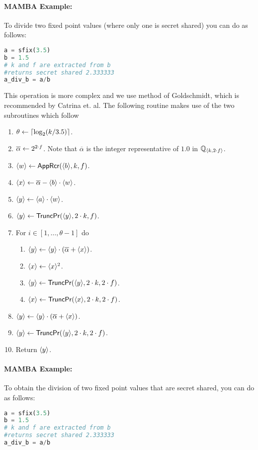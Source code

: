 \paragraph{MAMBA Example:} To divide two fixed point values (where only one is secret shared) you can do as follows:
\begin{lstlisting}[language={python}]
a = sfix(3.5)
b = 1.5
# k and f are extracted from b
#returns secret shared 2.333333
a_div_b = a/b
\end{lstlisting}
This operation is more complex and we use method of Goldschmidt, which
is recommended by Catrina et. al.
The following routine makes use of the two subroutines which follow
\begin{enumerate}
\item $\theta \leftarrow {\lceil \log_2 (k/3.5) \rceil}$. 
\item $\overline{\alpha} \leftarrow 2^{2 \cdot f}$. 
	Note that $\overline{\alpha}$ is the integer representative of $1.0$ in ${\mathbb{Q}}_{\langle k, 2\cdot f \rangle}$.
\item $\langle w \rangle \leftarrow \mathsf{AppRcr}(\langle b \rangle,k,f)$.
\item $\langle x \rangle \leftarrow \overline{\alpha} - \langle b \rangle\cdot \langle w \rangle$.
\item $\langle y \rangle \leftarrow \langle a \rangle\cdot \langle w \rangle$.
\item $\langle y \rangle \leftarrow \mathsf{TruncPr}(\langle y \rangle,2\cdot k,f)$.
\item For $i \in [1,\ldots,\theta-1]$ do
\begin{enumerate}
  \item $\langle y \rangle \leftarrow \langle y \rangle \cdot (\overline{\alpha}+\langle x \rangle)$.
  \item $\langle x \rangle \leftarrow \langle x \rangle^2$.
  \item $\langle y \rangle \leftarrow \mathsf{TruncPr}(\langle y \rangle,2\cdot k,2 \cdot f)$.
  \item $\langle x \rangle \leftarrow \mathsf{TruncPr}(\langle x \rangle,2\cdot k,2 \cdot f)$.
\end{enumerate}
\item $\langle y \rangle \leftarrow \langle y \rangle \cdot (\overline{\alpha}+\langle x \rangle)$.
\item $\langle y \rangle \leftarrow \mathsf{TruncPr}(\langle y \rangle,2\cdot k,2 \cdot f)$.
\item Return $\langle y \rangle$.
\end{enumerate}
\paragraph{MAMBA Example:} To obtain the division of two fixed point values that are secret shared, you can do as follows:
\begin{lstlisting}[language={python}]
a = sfix(3.5)
b = 1.5
# k and f are extracted from b
#returns secret shared 2.333333
a_div_b = a/b
\end{lstlisting}

